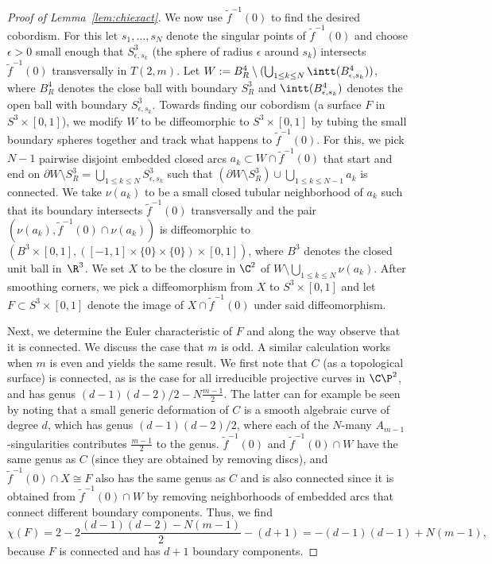 \begin{proof}[Proof of Lemma~\ref{lem:chiexact}]
We now use $\widetilde{f}^{-1}(0)$ to find the desired cobordism. For this let $s_1,\dots, s_N$ denote the singular points of $\widetilde{f}^{-1}(0)$ and choose $\epsilon>0$ small enough that $S^3_{\epsilon,s_k}$ (the sphere of radius $\epsilon$ around $s_k$) intersects $\widetilde{f}^{-1}(0)$ transversally in $T(2,m)$. Let $W:= B_R^4\setminus(\bigcup_{1\leq k\leq N}\intt(B^4_{\epsilon,s_k}))$, where $B^4_R$ denotes the close ball with boundary $S^3_R$ and $\intt(B^4_{\epsilon,s_k})$ denotes the open ball with boundary $S^3_{\epsilon,s_k}$. Towards finding our cobordism (a surface $F$ in $S^3\times [0,1]$), we modify $W$ to be diffeomorphic to $S^3\times [0,1]$ by tubing the small boundary spheres together and track what happens to $\widetilde{f}^{-1}(0)$. For this, we pick $N-1$ pairwise disjoint embedded closed arcs $a_k\subset W\cap\widetilde{f}^{-1}(0)$ that start and end on $\partial W\setminus S^3_R=\bigcup_{1\leq k\leq N} S^3_{\epsilon,s_k}$ such that $(\partial W\setminus S^3_R)\cup \bigcup_{1\leq k\leq N-1} a_k$ is connected. We take $\nu(a_k)$ to be a small closed tubular neighborhood of $a_k$ such that its boundary intersects $\widetilde{f}^{-1}(0)$ transversally and the pair $(\nu(a_k), \widetilde{f}^{-1}(0)\cap\nu(a_k))$ is diffeomorphic to $(B^3\times[0,1],([-1,1]\times\{0\}\times\{0\})\times[0,1])$, where $B^3$ denotes the closed unit ball in~$\R^3$. We set $X$ to be the closure in $\C^2$ of $W\setminus\bigcup_{1\leq k\leq N} \nu(a_k)$. After smoothing corners, we pick a diffeomorphism from $X$ to $S^3\times [0,1]$ and let $F\subset S^3\times [0,1]$ denote the image of $X\cap\widetilde{f}^{-1}(0)$ under said diffeomorphism.

Next, we determine the Euler characteristic of $F$ and along the way observe that it is connected. We discuss the case that $m$ is odd. A similar calculation works when $m$ is even and yields the same result. We first note that $C$ (as a topological surface) is connected, as is the case for all irreducible projective curves in $\C\P^2$, and has genus $(d-1)(d-2)/2-N\frac{m-1}{2}$. The latter can for example be seen by noting that a small generic deformation of $C$ is a smooth algebraic curve of degree $d$, which has genus $(d-1)(d-2)/2$, where each of the $N$-many $A_{m-1}$-singularities contributes $\frac{m-1}{2}$ to the genus. $\widetilde{f}^{-1}(0)$ and $\widetilde{f}^{-1}(0)\cap W$ have the same genus as $C$ (since they are obtained by removing discs), and $\widetilde{f}^{-1}(0)\cap X\cong F$ also has the same genus as $C$ and is also connected since it is obtained from $\widetilde{f}^{-1}(0)\cap W$ by removing neighborhoods of embedded arcs that connect different boundary components. Thus, we find
\[
\chi(F)=2-2\frac{(d-1)(d-2)-N(m-1)}{2}-(d+1) =-(d-1)(d-1)+N(m-1),
\]
because $F$ is connected and has $d+1$ boundary components.


\end{proof}

